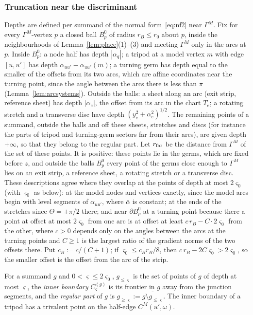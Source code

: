 \subsubsection*{Truncation near the discriminant}
Depths are defined per summand of the normal form~\eqref{eq:nf2} near $\Gamma^M$. Fix for every $\Gamma^M$-vertex $p$
a closed ball $B^0_p$ of radius $r_B\le r_0$ about $p$, inside the neighbourhoods of Lemma~\ref{lem:place}(1)--(3) and
meeting $\Gamma^M$ only in the arcs at $p$. Inside $B^0_p$: a node half has depth $|\alpha_q|$; a tripod at a model vertex
$m$ with edge $[u,u']$ has depth $\alpha_{uu'}-\alpha_{uu'}(m)$; a turning germ has depth equal to the smaller of the
offsets from its two arcs, which are affine coordinates near the turning point, since the angle between the arcs there is
less than $\pi$ (Lemma~\ref{lem:arcsystems}). Outside the balls: a sheet along an arc (exit strip, reference sheet) has
depth $|\alpha_e|$, the offset from its arc in the chart $T_e$; a rotating stretch and a transverse disc have depth
$(y_e^2+\alpha_e^2)^{1/2}$. The remaining points of a summand, outside the balls and off these sheets, stretches and
discs (for instance the parts of tripod and turning-germ sectors far from their arcs), are given depth $+\infty$, so that
they belong to the regular part. Let $r_{\rm far}$ be the distance from $\Gamma^M$ of the set of these points. It is
positive: these points lie in the germs, which are fixed before $z$, and outside the balls $B^0_p$ every point of the germs
close enough to $\Gamma^M$ lies on an exit strip, a reference sheet, a rotating stretch or a transverse disc. These descriptions agree where they overlap at the points of depth at most $2\varsigma_0$
(with $\varsigma_0$ as below): at the model nodes and vertices exactly, since the model arcs begin with level segments of
$\alpha_{uu'}$, where $\bar\alpha$ is constant; at the ends of the stretches since $\Theta=\pm\pi/2$ there; and near
$\partial B^0_p$ at a turning point because there a point at offset at most $2\varsigma_0$ from one arc is at offset at
least $c\,r_B-C\cdot2\varsigma_0$ from the other, where $c>0$ depends only on the angles between the arcs at the turning
points and $C\ge1$ is the largest ratio of the gradient norms of the two offsets there. Put $c_B:=c/(C+1)$; if
$\varsigma_0\le c_Br_B/8$, then $c\,r_B-2C\varsigma_0>2\varsigma_0$, so the smaller offset is the offset from the arc of the
strip.

\begin{definition}[depth]\label{def:depth}
For a summand $g$ and $0<\varsigma\le2\varsigma_0$, $g_{\le\varsigma}$ is the set of points of $g$ of depth at most
$\varsigma$, the \emph{inner boundary} $C^{(g)}_\varsigma$ is its frontier in $g$ away from the junction segments, and the
\emph{regular part} of $g$ is $g_{\ge\varsigma}:=\overline{g\setminus g_{\le\varsigma}}$. The inner boundary of a tripod has a
trivalent point on the half-edge $C^M(u',\omega)$.
\end{definition}

